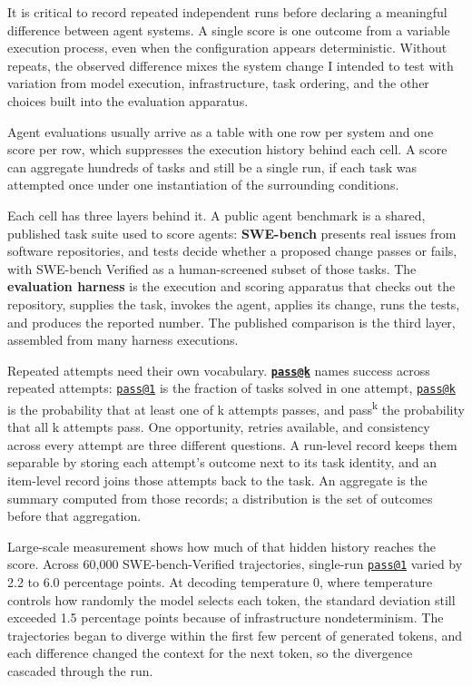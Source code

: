 It is critical to record repeated independent runs before declaring a meaningful difference between agent systems. A single score is one outcome from a variable execution process, even when the configuration appears deterministic. Without repeats, the observed difference mixes the system change I intended to test with variation from model execution, infrastructure, task ordering, and the other choices built into the evaluation apparatus.

Agent evaluations usually arrive as a table with one row per system and one score per row, which suppresses the execution history behind each cell. A score can aggregate hundreds of tasks and still be a single run, if each task was attempted once under one instantiation of the surrounding conditions.

Each cell has three layers behind it. A public agent benchmark is a shared, published task suite used to score agents: \textbf{SWE-bench} presents real issues from software repositories, and tests decide whether a proposed change passes or fails, with SWE-bench Verified as a human-screened subset of those tasks. The \textbf{evaluation harness} is the execution and scoring apparatus that checks out the repository, supplies the task, invokes the agent, applies its change, runs the tests, and produces the reported number. The published comparison is the third layer, assembled from many harness executions.

Repeated attempts need their own vocabulary. \textbf{\href{mailto:pass@k}{\nolinkurl{pass@k}}} names success across repeated attempts: \href{mailto:pass@1}{\nolinkurl{pass@1}} is the fraction of tasks solved in one attempt, \href{mailto:pass@k}{\nolinkurl{pass@k}} is the probability that at least one of k attempts passes, and pass\textsuperscript{k} the probability that all k attempts pass. One opportunity, retries available, and consistency across every attempt are three different questions. A run-level record keeps them separable by storing each attempt's outcome next to its task identity, and an item-level record joins those attempts back to the task. An aggregate is the summary computed from those records; a distribution is the set of outcomes before that aggregation.

Large-scale measurement shows how much of that hidden history reaches the score. Across 60,000 SWE-bench-Verified trajectories, single-run \href{mailto:pass@1}{\nolinkurl{pass@1}} varied by 2.2 to 6.0 percentage points. At decoding temperature 0, where temperature controls how randomly the model selects each token, the standard deviation still exceeded 1.5 percentage points because of infrastructure nondeterminism. The trajectories began to diverge within the first few percent of generated tokens, and each difference changed the context for the next token, so the divergence cascaded through the run.

